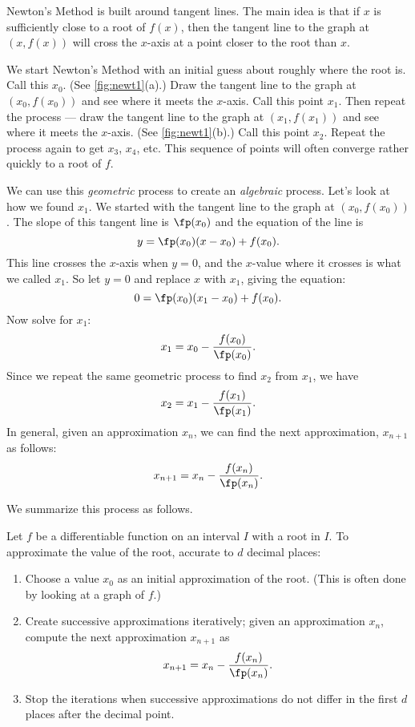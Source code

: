Newton's Method is built around tangent lines.  The main idea is that if $x$ is sufficiently close to a root of $f(x)$, then the  tangent line to the graph at $(x,f(x))$ will cross the $x$-axis at a point closer to the root than $x$.  

We start Newton's Method with an initial guess about roughly where the root is.  Call this $x_0$. (See \autoref{fig:newt1}(a).)  Draw the tangent line to the graph at $(x_0,f(x_0))$ and see where it meets the $x$-axis. Call this point $x_1$.  Then repeat the process --- draw the tangent line to the graph at $(x_1, f(x_1))$ and see where it meets the $x$-axis. (See \autoref{fig:newt1}(b).) Call this point $x_2$.  Repeat the process again to get $x_3$, $x_4$, etc.  This sequence of points will often converge rather quickly to a root of $f$.  

We can use this \textit{geometric} process to create an \textit{algebraic} process.  Let's look at how we found $x_1$.  We started with the tangent line to the graph at $(x_0,f(x_0))$.  The slope of this tangent line is $\fp(x_0)$ and the equation of the line is
\[y=\fp(x_0)(x-x_0)+f(x_0).\]
This line crosses the $x$-axis when $y=0$, and the $x$-value where it crosses is what we called $x_1$. So let $y=0$ and replace $x$ with $x_1$, giving the equation: 
\[ 0 = \fp(x_0)(x_1-x_0)+f(x_0).\] 
Now solve for $x_1$:
\[x_1=x_0-\frac{f(x_0)}{\fp(x_0)}.\]
Since we repeat the same geometric process to find $x_2$ from $x_1$, we have
\[x_2=x_1-\frac{f(x_1)}{\fp(x_1)}.\]
In general, given an approximation $x_n$, we can find the next approximation, $x_{n+1}$ as follows:
\[x_{n+1} = x_{n} - \frac{f(x_{n})}{\fp(x_{n})}.\]

We summarize this process as follows.

{Let $f$ be a differentiable function on an interval $I$ with a root in $I$. To approximate the value of the root, accurate to $d$ decimal places:
\begin{enumerate}
	\item		Choose a value $x_0$ as an initial approximation of the root. (This is often done by looking at a graph of $f$.)
	\item		Create successive approximations iteratively; given an approximation $x_n$, compute the next approximation $x_{n+1}$ as
	\[x_{n+1} = x_n - \frac{f(x_n)}{\fp(x_n)}.\]
	\item		Stop the iterations when successive approximations do not differ in the first $d$ places after the decimal point.
\end{enumerate}}


